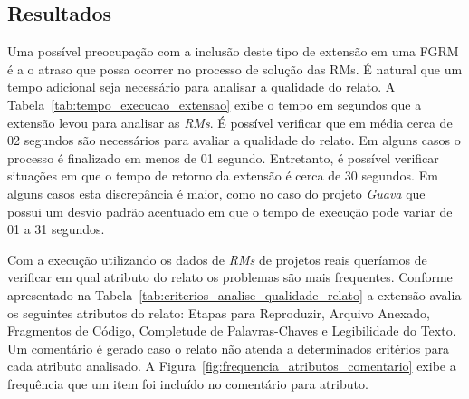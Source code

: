 \subsection{Resultados}
\label{sub:implementacao_extensao_avaliacao_resultados}

Uma possível preocupação com a inclusão deste tipo de extensão em uma FGRM é a o
atraso que possa ocorrer no processo de solução das RMs. É natural que um tempo
adicional seja necessário para analisar a qualidade do relato. A
Tabela~\ref{tab:tempo_execucao_extensao} exibe o tempo em segundos que a
extensão levou para analisar as \textit{RMs}. É possível verificar que em
média cerca de 02 segundos são necessários para avaliar a qualidade do relato.
Em alguns casos o processo é finalizado em menos de 01 segundo. Entretanto, é
possível verificar situações em que o tempo de retorno da extensão é cerca de 30
segundos. Em alguns casos esta discrepância é maior, como no caso do projeto
\textit{Guava} que possui um desvio padrão acentuado em que o tempo de execução
pode variar de 01 a 31 segundos.

\begin{table}[htpb]
\centering
{}
\caption{Tempo de execução da extensão.}
\label{tab:tempo_execucao_extensao}
\end{table}

Com a execução utilizando os dados de \textit{RMs} de projetos reais queríamos
de verificar em qual atributo do relato os problemas são mais frequentes.
Conforme apresentado na Tabela~\ref{tab:criterios_analise_qualidade_relato} a
extensão avalia os seguintes atributos do relato: Etapas para Reproduzir,
Arquivo Anexado, Fragmentos de Código, Completude de Palavras-Chaves e
Legibilidade do Texto. Um comentário é gerado caso o relato não atenda a
determinados critérios para cada atributo analisado. A
Figura~\ref{fig:frequencia_atributos_comentario} exibe a frequência que um item
foi incluído no comentário para atributo.

